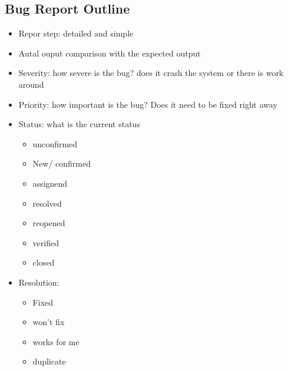\documentclass{article}
\begin{document}
 \subsection{ Bug Report Outline}
 \begin{itemize}
   \item Repor step: detailed and simple
   \item Autal ouput comparison with the expected output
   \item Severity: how severe is the bug? does it crash the system or there is
   work around
   \item Priority: how important is the bug? Does it need to be fixed right away
   \item Status: what is the current status
   \begin{itemize}
     \item unconfirmed
     \item New/ confirmed
     \item assignend
     \item resolved
     \item reopened
     \item verified
     \item closed
    \end{itemize}
   \item Resolution:
   \begin{itemize}
     \item Fixed
     \item won't fix
     \item works for me
     \item duplicate
    \end{itemize}
 \end{itemize}
  
\end{document}
